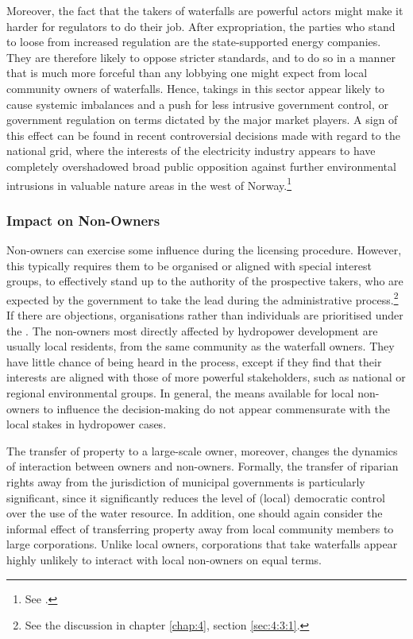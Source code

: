 Moreover, the fact that the takers of waterfalls are powerful actors might make it harder for regulators to do their job. After expropriation, the parties who stand to loose from increased regulation are the state-supported energy companies. They are therefore likely to oppose stricter standards, and to do so in a manner that is much more forceful than any lobbying one might expect from local community owners of waterfalls. Hence, takings in this sector appear likely to cause systemic imbalances and a push for less intrusive government control, or government regulation on terms dictated by the major market players. A sign of this effect can be found in recent controversial decisions made with regard to the national grid, where the interests of the electricity industry appears to have completely overshadowed broad public opposition against further environmental intrusions in valuable nature areas in the west of Norway.\footnote{See \cite{sataoen}.}

\subsubsection{Impact on Non-Owners}\label{sec:5:7:8}

Non-owners can exercise some influence during the licensing procedure. However, this typically requires them to be organised or aligned with special interest groups, to effectively stand up to the authority of the prospective takers, who are expected by the government to take the lead during the administrative process.\footnote{See the discussion in chapter \ref{chap:4}, section \ref{sec:4:3:1}.} If there are objections, organisations rather than individuals are prioritised under the \cite{wra17}. The non-owners most directly affected by hydropower development are usually local residents, from the same community as the waterfall owners. They have little chance of being heard in the process, except if they find that their interests are aligned with those of more powerful stakeholders, such as national or regional environmental groups. In general, the means available for local non-owners to influence the decision-making do not appear commensurate with the local stakes in hydropower cases.

The transfer of property to a large-scale owner, moreover, changes the dynamics of interaction between owners and non-owners. Formally, the transfer of riparian rights away from the jurisdiction of municipal governments is particularly significant, since it significantly reduces the level of (local) democratic control over the use of the water resource. In addition, one should again consider the informal effect of transferring property away from local community members to large corporations. Unlike local owners, corporations that take waterfalls appear highly unlikely to interact with local non-owners on equal terms.

